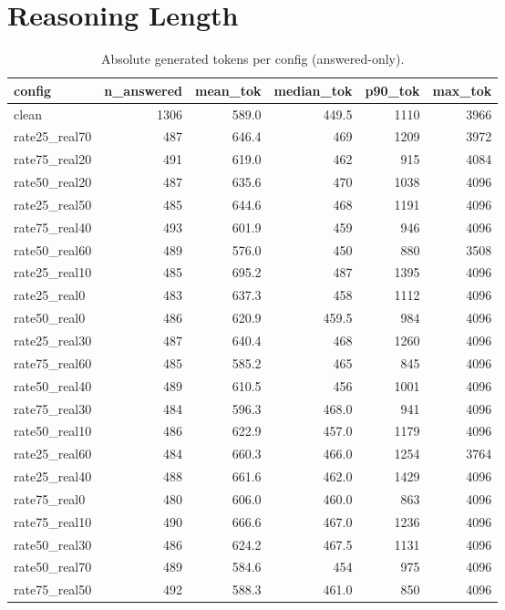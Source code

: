 \documentclass[11pt]{article}
\begin{document}
\section*{Reasoning Length}
\begin{table}[H]
\centering
\caption{Absolute generated tokens per config (answered-only).}
\small
\begin{adjustbox}{max width=\textwidth}
\begin{tabular}{lrrrrr}
\toprule
\textbf{config} & \textbf{n\_answered} & \textbf{mean\_tok} & \textbf{median\_tok} & \textbf{p90\_tok} & \textbf{max\_tok} \\
\midrule
clean & 1306 & 589.0 & 449.5 & 1110 & 3966 \\
rate25\_real70 & 487 & 646.4 & 469 & 1209 & 3972 \\
rate75\_real20 & 491 & 619.0 & 462 & 915 & 4084 \\
rate50\_real20 & 487 & 635.6 & 470 & 1038 & 4096 \\
rate25\_real50 & 485 & 644.6 & 468 & 1191 & 4096 \\
rate75\_real40 & 493 & 601.9 & 459 & 946 & 4096 \\
rate50\_real60 & 489 & 576.0 & 450 & 880 & 3508 \\
rate25\_real10 & 485 & 695.2 & 487 & 1395 & 4096 \\
rate25\_real0 & 483 & 637.3 & 458 & 1112 & 4096 \\
rate50\_real0 & 486 & 620.9 & 459.5 & 984 & 4096 \\
rate25\_real30 & 487 & 640.4 & 468 & 1260 & 4096 \\
rate75\_real60 & 485 & 585.2 & 465 & 845 & 4096 \\
rate50\_real40 & 489 & 610.5 & 456 & 1001 & 4096 \\
rate75\_real30 & 484 & 596.3 & 468.0 & 941 & 4096 \\
rate50\_real10 & 486 & 622.9 & 457.0 & 1179 & 4096 \\
rate25\_real60 & 484 & 660.3 & 466.0 & 1254 & 3764 \\
rate25\_real40 & 488 & 661.6 & 462.0 & 1429 & 4096 \\
rate75\_real0 & 480 & 606.0 & 460.0 & 863 & 4096 \\
rate75\_real10 & 490 & 666.6 & 467.0 & 1236 & 4096 \\
rate50\_real30 & 486 & 624.2 & 467.5 & 1131 & 4096 \\
rate50\_real70 & 489 & 584.6 & 454 & 975 & 4096 \\
rate75\_real50 & 492 & 588.3 & 461.0 & 850 & 4096 \\

\end{tabular}
\end{adjustbox}
\end{table}
\end{document}
